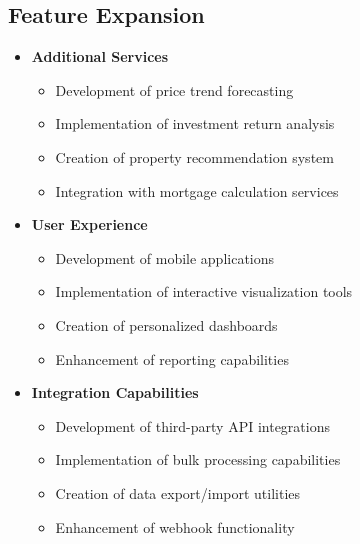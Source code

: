\documentclass[12pt,a4paper]{report}
\begin{document}
\subsection{Feature Expansion}
\begin{itemize}
    \item \textbf{Additional Services}
    \begin{itemize}
        \item Development of price trend forecasting
        \item Implementation of investment return analysis
        \item Creation of property recommendation system
        \item Integration with mortgage calculation services
    \end{itemize}

    \item \textbf{User Experience}
    \begin{itemize}
        \item Development of mobile applications
        \item Implementation of interactive visualization tools
        \item Creation of personalized dashboards
        \item Enhancement of reporting capabilities
    \end{itemize}

    \item \textbf{Integration Capabilities}
    \begin{itemize}
        \item Development of third-party API integrations
        \item Implementation of bulk processing capabilities
        \item Creation of data export/import utilities
        \item Enhancement of webhook functionality
    \end{itemize}
\end{itemize}
\end{document}
